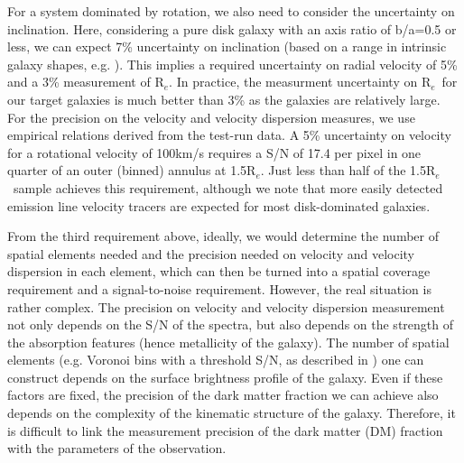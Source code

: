 \documentclass[preprint,11pt]{aastex}
\newcommand{\Reff}{{R$_{e}$}}
\begin{document}
For a system dominated by rotation, we also need to consider the
uncertainty on inclination. Here, considering a pure disk galaxy with
an axis ratio of b/a=0.5 or less, we can expect 7\% uncertainty on
inclination (based on a range in intrinsic galaxy shapes,
e.g. \citealt{padilla08}).  This implies a required uncertainty on
radial velocity of 5\% and a 3\% measurement of \Reff.  In practice,
the measurment uncertainty on \Reff\ for our target galaxies is much
better than 3\% as the galaxies are relatively large. For the
precision on the velocity and velocity dispersion measures, we use
empirical relations derived from the test-run data.  A 5\% uncertainty
on velocity for a rotational velocity of 100km/s requires a S/N of
17.4 per pixel in one quarter of an outer (binned) annulus at
1.5\Reff.  Just less than half of the 1.5\Reff\ sample achieves this
requirement, although we note that more easily detected emission line
velocity tracers are expected for most disk-dominated galaxies.





 From the third requirement above, ideally, we
would determine the number of spatial elements needed and the
precision needed on velocity and velocity dispersion in each element,
which can then be turned into a spatial coverage requirement and a
signal-to-noise requirement. However, the real situation is rather
complex.  The precision on velocity and velocity dispersion
measurement not only depends on the S/N of the spectra, but also
depends on the strength of the absorption features (hence metallicity
of the galaxy). The number of spatial elements (e.g. Voronoi bins with
a threshold S/N, as described in \citealt{cappellari2003}) one can
construct depends on the surface brightness profile of the
galaxy. Even if these factors are fixed, the precision of the dark
matter fraction we can achieve also depends on the complexity of the
kinematic structure of the galaxy. Therefore, it is difficult to link
the measurement precision of the dark matter (DM) fraction with the
parameters of the observation.
\end{document}

